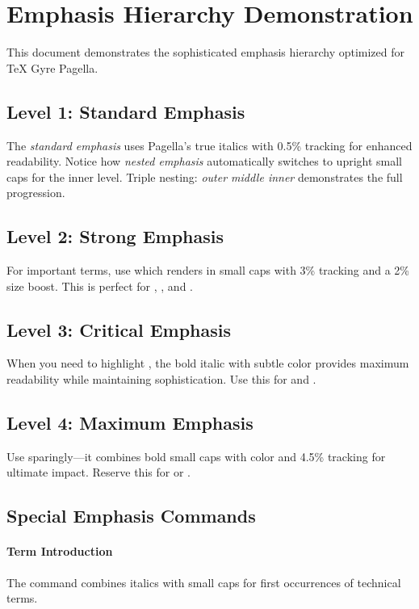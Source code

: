 \documentclass{article}
\begin{document}
\section{Emphasis Hierarchy Demonstration}

This document demonstrates the sophisticated emphasis hierarchy optimized for TeX Gyre Pagella.

\subsection{Level 1: Standard Emphasis}
The \emph{standard emphasis} uses Pagella's true italics with 0.5\% tracking for enhanced readability. 
Notice how \emph{nested \emph{emphasis}} automatically switches to upright small caps for the inner level.
Triple nesting: \emph{outer \emph{middle \emph{inner}}} demonstrates the full progression.

\subsection{Level 2: Strong Emphasis}  
For important terms, use  which renders in small caps with 3\% tracking and a 2\% size boost. 
This is perfect for , , and .

\subsection{Level 3: Critical Emphasis}
When you need to highlight , the bold italic with subtle color provides maximum readability while maintaining sophistication. 
Use this for  and .

\subsection{Level 4: Maximum Emphasis}
Use  sparingly---it combines bold small caps with color and 4.5\% tracking for ultimate impact.
Reserve this for  or .

\subsection{Special Emphasis Commands}

\paragraph{Term Introduction}
The  command combines italics with small caps for first occurrences of technical terms.
\end{document}
